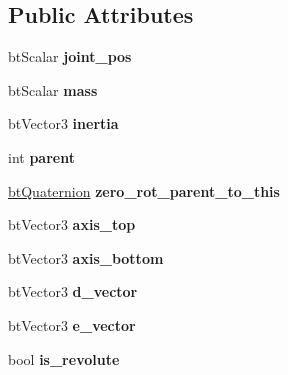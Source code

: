 \subsection*{Public Attributes}
\begin{DoxyCompactItemize}
\item 
\mbox{\label{structbtMultibodyLink_a1cbf8c5c9cf9fe027e8ae33d15501929}} 
bt\+Scalar {\bfseries joint\+\_\+pos}
\item 
\mbox{\label{structbtMultibodyLink_a210c784e9992801f9ee654bc024cda9c}} 
bt\+Scalar {\bfseries mass}
\item 
\mbox{\label{structbtMultibodyLink_aa8be26a6a70d10abe2a45324d22bc091}} 
bt\+Vector3 {\bfseries inertia}
\item 
\mbox{\label{structbtMultibodyLink_a1bb82bdf5bf02d97d0d7ddf8437af4b8}} 
int {\bfseries parent}
\item 
\mbox{\label{structbtMultibodyLink_a566b26ba2d03621795c35f2d43a98f8a}} 
\hyperlink{classbtQuaternion}{bt\+Quaternion} {\bfseries zero\+\_\+rot\+\_\+parent\+\_\+to\+\_\+this}
\item 
\mbox{\label{structbtMultibodyLink_aed564887f1cbd6eaf4d67ecfe2303a43}} 
bt\+Vector3 {\bfseries axis\+\_\+top}
\item 
\mbox{\label{structbtMultibodyLink_a4415d06e3ffc719466e079d3c8d22dc9}} 
bt\+Vector3 {\bfseries axis\+\_\+bottom}
\item 
\mbox{\label{structbtMultibodyLink_a869ba0339b1e610348af51c921b74c5b}} 
bt\+Vector3 {\bfseries d\+\_\+vector}
\item 
\mbox{\label{structbtMultibodyLink_aef98e21dc5769081b32ac5075259da64}} 
bt\+Vector3 {\bfseries e\+\_\+vector}
\item 
\mbox{\label{structbtMultibodyLink_a317e765bc486a882fa9e7d6dd9a8747d}} 
bool {\bfseries is\+\_\+revolute}
\item 
\mbox{\label{structbtMultibodyLink_ae72e6666815fb04a05b2f76565045a0c}} 

\end{DoxyCompactItemize}

